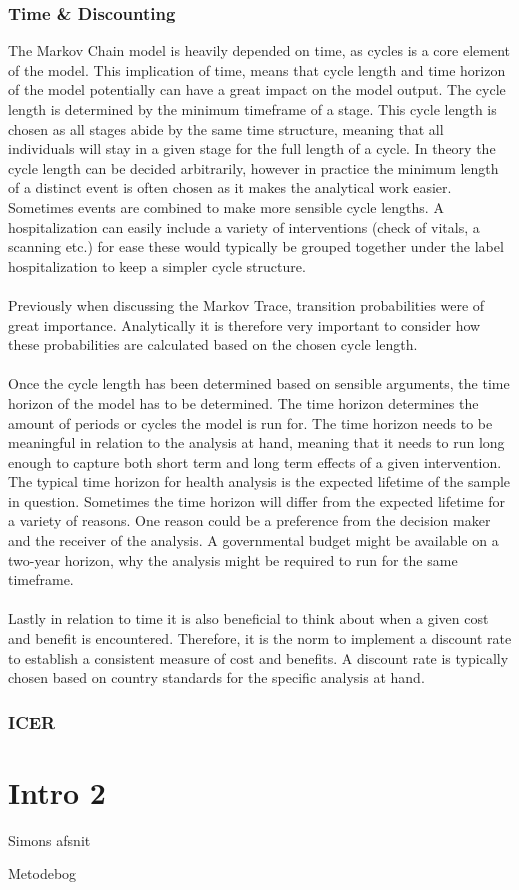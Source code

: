 \documentclass[a4paper,12pt]{article}
\begin{document}
\subsubsection*{Time \& Discounting}
The Markov Chain model is heavily depended on time, as cycles is a core element of the model. This implication of time, means that cycle length and time horizon of the model potentially can have a great impact on the model output. The cycle length is determined by the minimum timeframe of a stage. This cycle length is chosen as all stages abide by the same time structure, meaning that all individuals will stay in a given stage for the full length of a cycle. In theory the cycle length can be decided arbitrarily, however in practice the minimum length of a distinct event is often chosen as it makes the analytical work easier. Sometimes events are combined to make more sensible cycle lengths. A hospitalization can easily include a variety of interventions (check of vitals, a scanning etc.) for ease these would typically be grouped together under the label hospitalization to keep a simpler cycle structure. 
\\\\
Previously when discussing the Markov Trace, transition probabilities were of great importance. Analytically it is therefore very important to consider how these probabilities are calculated based on the chosen cycle length.
\\\\
Once the cycle length has been determined based on sensible arguments, the time horizon of the model has to be determined. The time horizon determines the amount of periods or cycles the model is run for. The time horizon needs to be meaningful in relation to the analysis at hand, meaning that it needs to run long enough to capture both short term and long term effects of a given intervention. The typical time horizon for health analysis is the expected lifetime of the sample in question. Sometimes the time horizon will differ from the expected lifetime for a variety of reasons. One reason could be a preference from the decision maker and the receiver of the analysis. A governmental budget might be available on a two-year horizon, why the analysis might be required to run for the same timeframe. 
\\\\
Lastly in relation to time it is also beneficial to think about when a given cost and benefit is encountered. Therefore, it is the norm to implement a discount rate to establish a consistent measure of cost and benefits. A discount rate is typically chosen based on country standards for the specific analysis at hand.

\subsubsection*{ICER}




\section{Intro 2}

Simons afsnit


\newpage
\begin{thebibliography}{9}

Metodebog


\end{thebibliography}	
	
\end{document}
